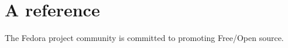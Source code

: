 \section{A reference}
The Fedora project community\cite{RedHat2008} is committed to promoting Free/Open source.


